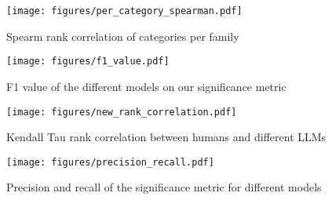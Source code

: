 \begin{figure*}[h!]
    \centering
    \scriptsize
    \texttt{[image: figures/per\_category\_spearman.pdf]}
    \caption{Spearm rank correlation of categories per family}
    \label{fig:spearman_cats}
\end{figure*}

\begin{figure*}[h!]
    \centering
    \scriptsize
    \texttt{[image: figures/f1\_value.pdf]}
    \caption{F1 value of the different models on our significance metric}
    \label{fig:f1_value}
\end{figure*}

\begin{figure}[t]
    \centering
    \scriptsize
    \texttt{[image: figures/new\_rank\_correlation.pdf]}
    \caption{Kendall Tau rank correlation between humans and different LLMs}
    \label{fig:kendall_tau}
\end{figure}

\begin{figure}[t!]
    \centering
    \texttt{[image: figures/precision\_recall.pdf]}
    \caption{Precision and recall of the significance metric for different models}
    \label{fig:prec_recall}
    \vspace{-0.5cm}
\end{figure}